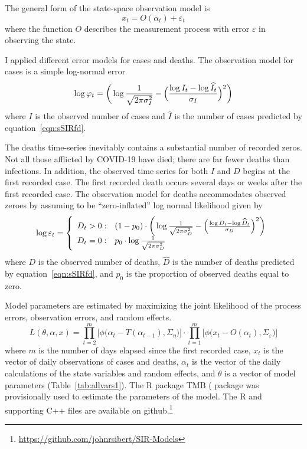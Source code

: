 \documentclass[12pt,letterpaper]{article}
\begin{document}
The general form of the state-space observation model is
\begin{equation}
x_t = O(\alpha_t) + \varepsilon_t
\end{equation}
where the function $O$ describes the measurement process with
error $\varepsilon$ in observing the state.

I applied different error models for cases and
deaths. The observation model for cases is a simple log-normal error
\begin{equation}
\log\varphi_t = \bigg(\log\frac{1}{\sqrt{2\pi\sigma^2_I}} -\Bigl(\frac{\log
I_t-\log\widehat{I}_t}{\sigma_I}\Bigr)^2\bigg)\\
\end{equation}
where $I$ is the observed number of cases and $\widehat{I}$ is the
number of cases predicted by equation~\ref{eqn:sSIRfd}.

The deaths time-series inevitably contains a
substantial number of recorded zeros. 
Not all those afflicted by COVID-19 have died; there are far fewer
deaths than infections. In addition,
the observed time series for both $I$ and $D$ begins at the first recorded
case. The first recorded death occurs several days or weeks after the
first recorded case. 
The observation model for deaths accommodates observed zeroes by
assuming to be ``zero-inflated'' log normal likelihood given by
\begin{equation}
  \log \varepsilon_t = \left\{
    \begin{array}{r@{\;:\quad}l}
       D_t > 0 &
(1-p_0)\cdot\bigg(\log\frac{1}{\sqrt{2\pi\sigma^2_D}}
          -\Bigl(\frac{\log D_t-\log\widehat{D}_t}{\sigma_D}\Bigr)^2\bigg)\\
       D_t = 0 & p_0 \cdot\log \frac{1}{\sqrt{2\pi\sigma^2_D}}\\
    \end{array}
  \right.
\end{equation}
where $D$ is the observed number of deaths,
$\widehat{D}$ is the number of deaths predicted by
equation~\ref{eqn:sSIRfd}, 
and $p_0$ is the proportion of observed deaths equal to zero.

\cite{Sibert2017,Nielsen2014b}


Model parameters are estimated by
maximizing the joint likelihood of the process errors, observation
errors, and random effects.
\begin{equation}
\label{eqn:likelihood}
L(\theta,\alpha,x)=
\prod^m_{t=2}\big[\phi\big(\alpha_t-T(\alpha_{t-1}), \Sigma_\eta\big)\big]\cdot
\prod^m_{t=1}\big[\phi\big(x_t-O(\alpha_t),
\Sigma_\varepsilon\big)\big]
\end{equation}
where $m$ is the number of days elapsed since the first recorded case,
$x_t$ is the vector of daily observations of cases and deaths,
$\alpha_t$ is the vector of the daily calculations of the state
variables and random effects,
and $\theta$ 
is a vector of model parameters (Table~\ref{tab:allvars1}).
The R package TMB (\cite{TMB0000} package was provisionally used to 
estimate the parameters of the model. 
The R and supporting C++ files are available on 
github.\footnote{\url{https://github.com/johnrsibert/SIR-Models}}
\end{document}
